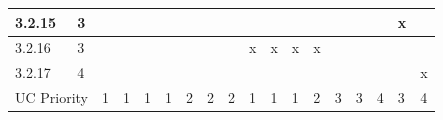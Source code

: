 \documentclass[runningheads,a4paper]{article}
\begin{document}
\begin{table}[]
\begin{tabular}{llllllllllllllllll}
\multicolumn{1}{|l|}{3.2.15}       & \multicolumn{1}{l|}{3}        & \multicolumn{1}{l|}{}    & \multicolumn{1}{l|}{}    & \multicolumn{1}{l|}{}    & \multicolumn{1}{l|}{}    & \multicolumn{1}{l|}{}    & \multicolumn{1}{l|}{}    & \multicolumn{1}{l|}{}    & \multicolumn{1}{l|}{}    & \multicolumn{1}{l|}{}    & \multicolumn{1}{l|}{}     & \multicolumn{1}{l|}{}     & \multicolumn{1}{l|}{}     & \multicolumn{1}{l|}{}     & \multicolumn{1}{l|}{}     & \multicolumn{1}{l|}{x}    & \multicolumn{1}{l|}{}     \\ \hline
\multicolumn{1}{|l|}{3.2.16}       & \multicolumn{1}{l|}{3}        & \multicolumn{1}{l|}{}    & \multicolumn{1}{l|}{}    & \multicolumn{1}{l|}{}    & \multicolumn{1}{l|}{}    & \multicolumn{1}{l|}{}    & \multicolumn{1}{l|}{}    & \multicolumn{1}{l|}{}    & \multicolumn{1}{l|}{x}   & \multicolumn{1}{l|}{x}   & \multicolumn{1}{l|}{x}    & \multicolumn{1}{l|}{x}    & \multicolumn{1}{l|}{}     & \multicolumn{1}{l|}{}     & \multicolumn{1}{l|}{}     & \multicolumn{1}{l|}{}     & \multicolumn{1}{l|}{}     \\ \hline
\multicolumn{1}{|l|}{3.2.17}       & \multicolumn{1}{l|}{4}        & \multicolumn{1}{l|}{}    & \multicolumn{1}{l|}{}    & \multicolumn{1}{l|}{}    & \multicolumn{1}{l|}{}    & \multicolumn{1}{l|}{}    & \multicolumn{1}{l|}{}    & \multicolumn{1}{l|}{}    & \multicolumn{1}{l|}{}    & \multicolumn{1}{l|}{}    & \multicolumn{1}{l|}{}     & \multicolumn{1}{l|}{}     & \multicolumn{1}{l|}{}     & \multicolumn{1}{l|}{}     & \multicolumn{1}{l|}{}     & \multicolumn{1}{l|}{}     & \multicolumn{1}{l|}{x}    \\ \hline
\multicolumn{2}{l}{UC Priority}                                    & 1                        & 1                        & 1                        & 1                        & 2                        & 2                        & 2                        & 1                        & 1                        & 1                         & 2                         & 3                         & 3                         & 4                         & 3                         & 4                        
\end{tabular}
\end{table}

\pagebreak
\end{document}
